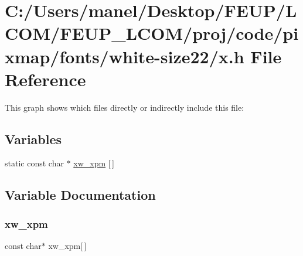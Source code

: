 \hypertarget{white-size22_2x_8h}{}\section{C\+:/\+Users/manel/\+Desktop/\+F\+E\+U\+P/\+L\+C\+O\+M/\+F\+E\+U\+P\+\_\+\+L\+C\+O\+M/proj/code/pixmap/fonts/white-\/size22/x.h File Reference}
\label{white-size22_2x_8h}
This graph shows which files directly or indirectly include this file\+:
\subsection*{Variables}
\begin{DoxyCompactItemize}
\item 
static const char $\ast$ \mbox{\hyperlink{white-size22_2x_8h_a4b5c8bd9da91d9bbb065900de7d82084}{xw\+\_\+xpm}} \mbox{[}$\,$\mbox{]}
\end{DoxyCompactItemize}


\subsection{Variable Documentation}
\mbox{\label{white-size22_2x_8h_a4b5c8bd9da91d9bbb065900de7d82084}} 
\subsubsection{\texorpdfstring{xw\_xpm}{xw\_xpm}}
{\footnotesize\ttfamily const char$\ast$ xw\+\_\+xpm\mbox{[}$\,$\mbox{]}\hspace{0.3cm}{\ttfamily [static]}}

